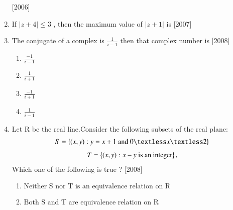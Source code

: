 \documentclass[journal,12pt,twocolumn,article]{IEEEtran}
\theoremstyle{remark}
\begin{document}
\begin{enumerate}[start = 14]
\hfill{[2006]}
\begin{enumerate}
\end{enumerate}
\item If $|z+4|\leq 3$ , then the maximum value of $|z+1|$ is
\hfill{[2007]}                                     
\begin{enumerate}                                  
\end{enumerate}
\item The conjugate of a complex is $\frac{1}{i-1}$ then that complex number is
\hfill{[2008]}
\begin{multicols}{4}
\begin{enumerate}
\item $\frac{-1}{i-1}$
\item $\frac{1}{i+1}$
\item $\frac{-1}{i+1}$
\item $\frac{1}{i-1}$
\end{enumerate}
\end{multicols}
\item Let R be the real line.Consider the following subsets of the real plane: 
\begin{align}
S=\cbrak{(x,y):y=x+1 \text{ and } 0{\textless}x{\textless}2}
\end{align}
\begin{align}
T=\left\{(x,y):x-y \text{ is an integer}\right\}, 
\end{align}
Which one of the following is true ?
\hfill{[2008]}
\begin{enumerate}
\item $\text{Neither S nor T is an equivalence relation on R}$                                     
\item $\text{Both S and T are equivalence relation on R }$
                                

\end{enumerate}
\end{enumerate}
\end{document}
